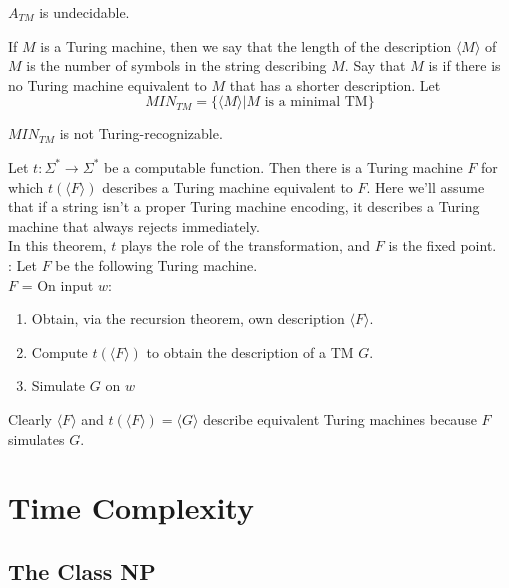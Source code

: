 \documentclass{article}
\begin{document}
 \begin{theorem}
   $A_{TM}$ is undecidable. 
 \end{theorem}

\begin{definition}
  If $M$ is a Turing machine, then we say that the length of the description $\langle M \rangle$ of $M$ is the number of symbols in the string describing $M$. Say that $M$ is  if there is no Turing machine equivalent to $M$ that has a shorter description. Let $$MIN_{TM} = \{\langle M \rangle \vert M \textrm{ is a minimal TM}\}$$
\end{definition}

\begin{theorem}
  $MIN_{TM}$ is not Turing-recognizable. 
\end{theorem}

\begin{theorem}
  Let $t: \Sigma^{*} \rightarrow \Sigma^{*}$ be a computable function. Then there is a Turing machine $F$ for which $t(\langle F \rangle)$ describes a Turing machine equivalent to $F$. Here we'll assume that if a string isn't a proper Turing machine encoding, it describes a Turing machine that always rejects immediately. \\ 
  In this theorem, $t$ plays the role of the transformation, and $F$ is the fixed point.\\ 

  : Let $F$ be the following Turing machine. \\ 
  $F$ = On input $w$: 
  \begin{enumerate}
    \item Obtain, via the recursion theorem, own description $\langle F \rangle$. 
    \item Compute $t(\langle F \rangle)$ to obtain the description of a TM $G$. 
    \item Simulate $G$ on $w$
  \end{enumerate}
  Clearly $\langle F \rangle$ and $t(\langle F \rangle) = \langle G \rangle$ describe equivalent Turing machines because $F$ simulates $G$. 
\end{theorem}

\section{Time Complexity}

\subsection{The Class NP}
\end{document}
